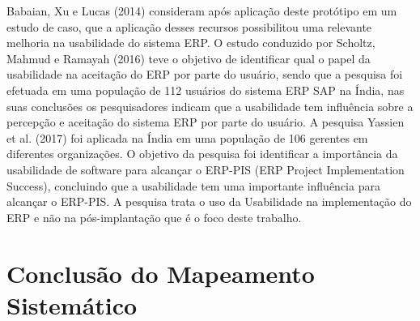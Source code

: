 \newline
\indent Babaian, Xu e Lucas (2014) consideram após aplicação deste protótipo em um estudo de caso, que a aplicação desses recursos possibilitou uma relevante melhoria na usabilidade do sistema ERP.\newline
\newline
\indent O estudo conduzido por Scholtz, Mahmud e Ramayah (2016) teve o objetivo de identificar qual o papel da usabilidade na aceitação do ERP por parte do usuário, sendo que a  pesquisa foi efetuada em uma população de 112 usuários do sistema ERP SAP na Índia, nas suas conclusões os pesquisadores  indicam que a usabilidade tem influência sobre a percepção e aceitação do sistema ERP por parte do usuário.\newline
\newline
\newline
\indent A pesquisa Yassien et al. (2017) foi aplicada na Índia em uma população de 106 gerentes em diferentes organizações. O objetivo da pesquisa foi identificar a importância da usabilidade de software para alcançar o ERP-PIS (ERP Project Implementation Success), concluindo que a usabilidade tem uma importante influência para alcançar o ERP-PIS. A pesquisa trata o uso da  Usabilidade na  implementação do ERP e não na pós-implantação que é o foco deste trabalho.\newline

\section{Conclusão do Mapeamento Sistemático}

